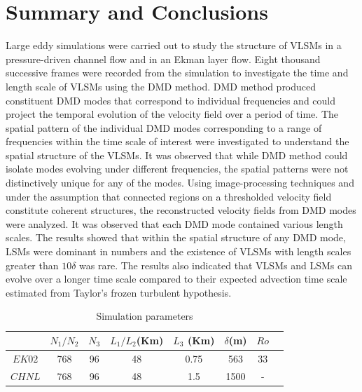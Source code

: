 \section{Summary and Conclusions}
Large eddy simulations were carried out to study the structure of VLSMs in a pressure-driven channel flow and in an Ekman layer flow. Eight thousand successive frames were recorded from the simulation to investigate the time and length scale of VLSMs using the DMD method. DMD method produced constituent DMD modes that correspond to individual frequencies and could project the temporal evolution of the velocity field over a period of time. The spatial pattern of the individual DMD modes corresponding to a range of frequencies within the time scale of interest were investigated to understand the spatial structure of the VLSMs. It was observed that while DMD method could isolate modes evolving under different frequencies, the spatial patterns were not distinctively unique for any of the modes. Using image-processing techniques and under the assumption that connected regions on a thresholded velocity field constitute coherent structures, the reconstructed velocity fields from DMD modes were analyzed. It was observed that each DMD mode contained various length scales. The results showed that within the spatial structure of any DMD mode, LSMs were dominant in numbers and the existence of VLSMs with length scales greater than $10\delta$ was rare. The results also indicated that VLSMs and LSMs can evolve over a longer time scale compared to their expected advection time scale estimated from Taylor's frozen turbulent hypothesis. 



\clearpage
 

    \begin{table}
    \caption{Simulation parameters}
    \centering
	\begin{tabular}{ c c c c c c c c}
	\hline 
		       & $N_1/N_2$ & $N_3$   & $L_1/L_2$(Km)  & $L_3$ (Km) & $\delta$(m)   & $Ro$ \\
    \hline 
     $EK02$    & 768       &  96     & 48             &  0.75      & 563           & 33  \\
     $CHNL$    & 768       &  96     & 48             &  1.5       & 1500          & - \\
    \hline 
    \hline 
    \end{tabular}
    \label{tab:sim_param}
    \end{table}

